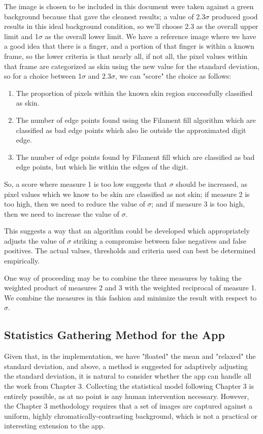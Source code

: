 The image is chosen to be included in this document were taken against a green background because that gave the cleanest results; a value of 2.3$\sigma$ produced good results in this ideal background condition, so we'll choose 2.3 as the overall upper limit and 1$\sigma$ as the overall lower limit. We have a reference image where we have a good idea that there is a finger, and a portion of that finger is within a known frame, so the lower criteria is that nearly all, if not all, the pixel values within that frame are categorized as skin using the new value for the standard deviation, so for a choice between 1$\sigma$ and 2.3$\sigma$, we can "score" the choice as follows:

\begin{enumerate}
\item The proportion of pixels within the known skin region successfully classified as skin.
\item The number of edge points found using the Filament fill algorithm which are classified as bad edge points which also lie outside the approximated digit edge.
\item The number of edge points found by Filament fill which are classified as bad edge points, but which lie within the edges of the digit.
\end{enumerate}

So, a score where measure 1 is too low suggests that $\sigma$ should be increased, as pixel values which we know to be skin are classified as not skin; if measure 2 is too high, then we need to reduce the value of $\sigma$; and if measure 3 is too high, then we need to increase the value of $\sigma$.

This suggests a way that an algorithm could be developed which appropriately adjusts the value of $\sigma$ striking a compromise between false negatives and false positives. The actual values, thresholds and criteria used can best be determined empirically.

One way of proceeding may be to combine the three measures by taking the weighted product of measures 2 and 3 with the weighted reciprocal of measure 1. We combine the measures in this fashion and minimize the result with respect to $\sigma$.

\subsection{Statistics Gathering Method for the App}\label{sec:StatisticsGatheringMethod}
Given that, in the implementation, we have "floated" the mean and "relaxed" the standard deviation, and above, a method is suggested for adaptively adjusting the standard deviation, it is natural to consider whether the app can handle all the work from Chapter 3. Collecting the statistical model following Chapter 3 is entirely possible, as at no point is any human intervention necessary. However, the Chapter 3 methodology requires that a set of images are captured against a uniform, highly chromatically-contrasting background, which is not a practical or interesting extension to the app.

